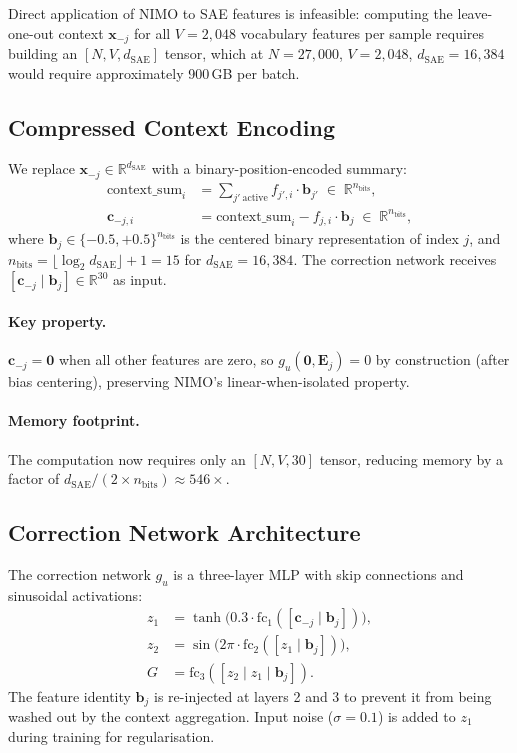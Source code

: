 \documentclass[11pt]{article}
\newcommand{\bfx}{\mathbf{x}}
\newcommand{\bfc}{\mathbf{c}}
\newcommand{\bfb}{\mathbf{b}}
\begin{document}
Direct application of NIMO to SAE features is infeasible: computing the leave-one-out context $\bfx_{-j}$ for all $V = 2{,}048$ vocabulary features per sample requires building an $[N, V, d_\mathrm{SAE}]$ tensor, which at $N = 27{,}000$, $V = 2{,}048$, $d_\mathrm{SAE} = 16{,}384$ would require approximately 900\,GB per batch.

\subsection{Compressed Context Encoding}

We replace $\bfx_{-j} \in \mathbb{R}^{d_\mathrm{SAE}}$ with a binary-position-encoded summary:
\begin{align}
    \mathrm{context\_sum}_i &= \sum_{j'\ \mathrm{active}} f_{j',i} \cdot \bfb_{j'} \;\in\; \mathbb{R}^{n_\mathrm{bits}}, \\
    \bfc_{-j,i} &= \mathrm{context\_sum}_i - f_{j,i} \cdot \bfb_j \;\in\; \mathbb{R}^{n_\mathrm{bits}},
\end{align}
where $\bfb_j \in \{-0.5, +0.5\}^{n_\mathrm{bits}}$ is the centered binary representation of index $j$, and $n_\mathrm{bits} = \lfloor \log_2 d_\mathrm{SAE} \rfloor + 1 = 15$ for $d_\mathrm{SAE} = 16{,}384$.
The correction network receives $[\bfc_{-j} \mid \bfb_j] \in \mathbb{R}^{30}$ as input.

\paragraph{Key property.}
$\bfc_{-j} = \mathbf{0}$ when all other features are zero, so $g_u(\mathbf{0}, \mathbf{E}_j) = 0$ by construction (after bias centering), preserving NIMO's linear-when-isolated property.

\paragraph{Memory footprint.}
The computation now requires only an $[N, V, 30]$ tensor, reducing memory by a factor of $d_\mathrm{SAE} / (2 \times n_\mathrm{bits}) \approx 546\times$.

\subsection{Correction Network Architecture}

The correction network $g_u$ is a three-layer MLP with skip connections and sinusoidal activations:
\begin{align}
    z_1 &= \tanh\!\bigl(0.3 \cdot \mathrm{fc}_1([\bfc_{-j} \mid \bfb_j])\bigr), \\
    z_2 &= \sin\!\bigl(2\pi \cdot \mathrm{fc}_2([z_1 \mid \bfb_j])\bigr), \\
    G   &= \mathrm{fc}_3([z_2 \mid z_1 \mid \bfb_j]).
\end{align}
The feature identity $\bfb_j$ is re-injected at layers 2 and 3 to prevent it from being washed out by the context aggregation. Input noise ($\sigma = 0.1$) is added to $z_1$ during training for regularisation.
\end{document}

